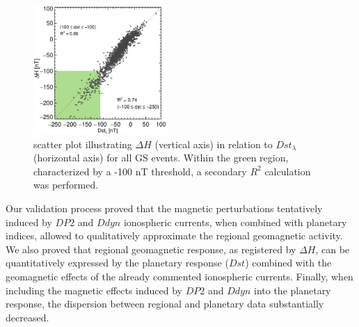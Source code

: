 \documentclass[a4paper,fleqn]{cas-dc}
\begin{document}
\begin{figure}
    \centering
     \includegraphics[width=0.45\textwidth]{dispersion_general_dst_ld.eps}
      \caption{scatter plot illustrating $\Delta H$ (vertical axis) in relation to $Dst_\lambda$ (horizontal axis) for all GS events. Within the green region, characterized by a -100 nT threshold, a secondary $R^2$ calculation was performed.}
       \label{fig:valid_disp2}
\end{figure}

Our validation process proved that the magnetic perturbations tentatively induced by $DP2$ and $Ddyn$ ionospheric currents, when combined with planetary indices, allowed to qualitatively approximate the regional geomagnetic activity. We also proved that regional geomagnetic response, as registered by $\Delta H$, can be quantitatively expressed by the planetary response ($Dst$) combined with the geomagnetic effects of the already commented ionospheric currents. Finally, when including the magnetic effects induced by $DP2$ and $Ddyn$ into the planetary response, the dispersion between regional and planetary data substantially decreased.



\end{document}
